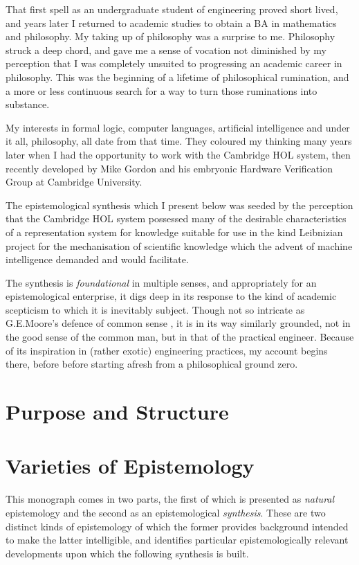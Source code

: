 \documentclass[10pt,titlepage]{book}
\begin{document}
That first spell as an undergraduate student of engineering proved short lived, and years later I returned to academic studies to obtain a BA in mathematics and philosophy.
My taking up of philosophy was a surprise to me.
Philosophy struck a deep chord, and gave me a sense of vocation not diminished by my perception that I was completely unsuited to progressing an academic career in philosophy.
This was the beginning of a lifetime of philosophical rumination, and a more or less continuous search for a way to turn those ruminations into substance.

My interests in formal logic, computer languages, artificial intelligence and under it all, philosophy, all date from that time.
They coloured my thinking many years later when I had the opportunity to work with the Cambridge HOL system, then recently developed by Mike Gordon and his embryonic Hardware Verification Group at Cambridge University.

The epistemological synthesis which I present below was seeded by the perception that the Cambridge HOL system possessed many of the desirable characteristics of a representation system for knowledge suitable for use in the kind Leibnizian project for the mechanisation of scientific knowledge which the advent of machine intelligence demanded and would facilitate.

The synthesis is \emph{foundational} in multiple senses, and appropriately for an epistemological enterprise, it digs deep in its response to the kind of academic scepticism to which it is inevitably subject.
Though not so intricate as G.E.Moore's defence of common sense \cite{moore1925,moore1993}, it is in its way similarly grounded, not in the good sense of the common man, but in that of the practical engineer.
Because of its inspiration in (rather exotic) engineering practices, my account begins there, before before starting afresh from a philosophical ground zero.

\section{Purpose and Structure}

\section{Varieties of Epistemology}

This monograph comes in two parts, the first of which is presented as \emph{natural} epistemology and the second as an epistemological \emph{synthesis}.
These are two distinct kinds of epistemology of which the former provides background intended to make the latter intelligible, and identifies particular epistemologically relevant developments upon which the following synthesis is built.
\end{document}
